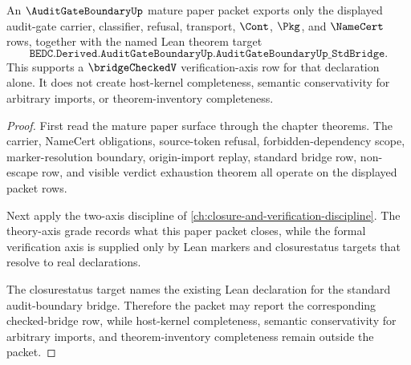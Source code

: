 \begin{theorem}
\label{thm:audit-gate-boundary-formal-axis-refusal}
An $\AuditGateBoundaryUp$ mature paper packet exports only the displayed audit-gate carrier, classifier, refusal, transport, $\Cont$, $\Pkg$, and $\NameCert$ rows, together with the named Lean theorem target
$$
\texttt{BEDC.Derived.AuditGateBoundaryUp.AuditGateBoundaryUp\_StdBridge}.
$$
This supports a $\bridgeCheckedV$ verification-axis row for that declaration alone. It does not create host-kernel completeness, semantic conservativity for arbitrary imports, or theorem-inventory completeness.
\end{theorem}
\begin{proof}
First read the mature paper surface through the chapter theorems. The carrier, NameCert obligations, source-token refusal, forbidden-dependency scope, marker-resolution boundary, origin-import replay, standard bridge row, non-escape row, and visible verdict exhaustion theorem all operate on the displayed packet rows.

Next apply the two-axis discipline of \autoref{ch:closure-and-verification-discipline}. The theory-axis grade records what this paper packet closes, while the formal verification axis is supplied only by Lean markers and closurestatus targets that resolve to real declarations.

The closurestatus target names the existing Lean declaration for the standard audit-boundary bridge. Therefore the packet may report the corresponding checked-bridge row, while host-kernel completeness, semantic conservativity for arbitrary imports, and theorem-inventory completeness remain outside the packet.
\end{proof}


